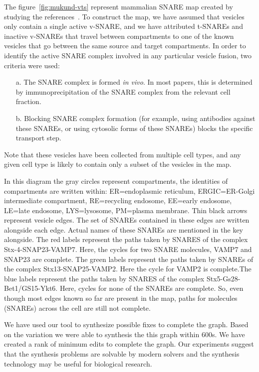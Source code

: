 The figure~\ref{fig:mukund-vts} represent mammalian SNARE map created by studying the references~\cite{somya}. 
To construct the map, we have assumed that vesicles only contain a single
active v-SNARE, and we have attributed t-SNAREs and inactive v-SNAREs that
travel between compartments to one of the known vesicles that go between
the same source and target compartments.
In order to identify the active SNARE complex involved in any particular
vesicle fusion, two criteria were used: 
\begin{enumerate}
\item[a.] The SNARE complex is formed \textit{in vivo}. In most papers, this is determined by immunoprecipitation of the SNARE complex from the relevant cell fraction. 
\item[b.] Blocking SNARE complex formation (for example, using antibodies against these SNAREs, or
using cytosolic forms of these SNAREs) blocks the specific transport step.
\end{enumerate}


Note that these vesicles have been collected from multiple cell types, and
any given cell type is likely to contain only a subset of the vesicles in
the map.

In this diagram the gray circles represent compartments, the identities of compartments are
written within: ER=endoplasmic reticulum, ERGIC=ER-Golgi intermediate compartment,
RE=recycling endosome, EE=early endosome, LE=late endosome, LYS=lysosome, PM=plasma
membrane. Thin black arrows represent vesicle edges.
The set of SNAREs contained in these edges are written alongside each edge. Actual names
of these SNAREs are mentioned in the key alongside. The red labels represent the paths taken by
SNARES of the complex Stx-4-SNAP23-VAMP7. Here, the cycles for two SNARE molecules,
VAMP7 and SNAP23 are complete. The green labels represent the paths taken by SNAREs of the
complex Stx13-SNAP25-VAMP2. Here the cycle for VAMP2 is complete.The blue labels represent
the paths taken by SNARES of the complex Stx5-Gs28-Bet1/GS15-Ykt6. Here, cycles for none of
the SNAREs are complete. So, even though most edges known so far are present in the map, paths for molecules (SNAREs) across the cell are still not complete.

We have used our tool to synthesize possible fixes to complete the graph. Based on the variation we were able to synthesis the this graph within 600s. We have created a rank of minimum edits to complete the graph. Our experiments suggest that the synthesis problems are solvable by modern solvers and the synthesis technology may be useful for biological research.

